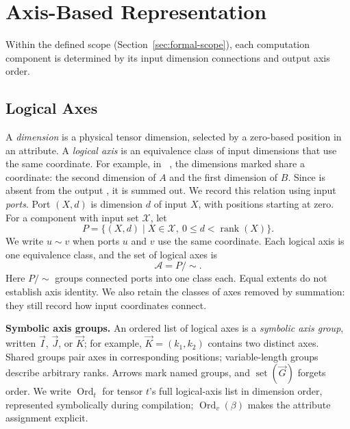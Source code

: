 \section{Axis-Based Representation}
\label{sec:axis-model}
Within the defined scope (Section~\ref{sec:formal-scope}), each computation
component is determined by its input dimension connections and output axis order.

\subsection{Logical Axes}
\label{sec:logical-axes}
A \emph{dimension} is a physical tensor dimension, selected by a zero-based
position in an  attribute. A \emph{logical axis} is an equivalence
class of input dimensions that use the same coordinate. For example, in
~\cite{numpy-einsum}, the dimensions marked
 share a coordinate: the second dimension of $A$ and the first dimension of
$B$. Since  is absent from the output , it is summed out.
We record this relation using input \emph{ports}. Port $(X,d)$ is dimension
$d$ of input $X$, with positions starting at zero. For a component with input
set $\mathcal X$, let
\begin{equation}
 P=\{(X,d)\mid X\in\mathcal X,\ 0\le d<\operatorname{rank}(X)\}.
\end{equation}
We write $u\sim v$ when ports $u$ and $v$ use the same coordinate.
Each logical axis is one equivalence class, and the set of logical axes is
\begin{equation}
 \mathcal A=P/{\sim}.
\end{equation}
Here $P/{\sim}$ groups connected ports into one class each.
Equal extents do not establish axis identity. We also retain the classes of
axes removed by summation: they still record how input coordinates connect.

\noindent\textbf{Symbolic axis groups.}
An ordered list of logical axes is a \emph{symbolic axis group}, written
$\vec I$, $\vec J$, or $\vec K$; for example, $\vec K=(k_1,k_2)$ contains
two distinct axes. Shared groups pair axes in corresponding positions;
variable-length groups describe arbitrary ranks. Arrows mark named groups,
and $\operatorname{set}(\vec G)$ forgets order. We write
$\operatorname{Ord}_t$ for tensor $t$'s full logical-axis list in dimension
order, represented symbolically during compilation;
$\operatorname{Ord}_v(\beta)$ makes the attribute assignment explicit.


